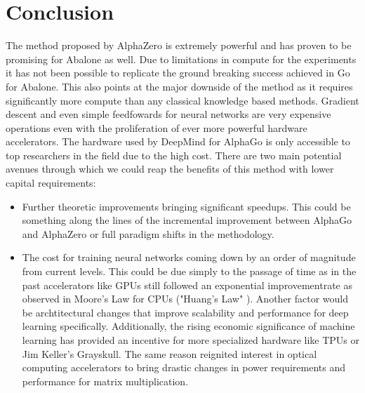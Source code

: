 \chapter{Conclusion}
\label{conclusion}
The method proposed by AlphaZero is extremely powerful and has proven to be promising for Abalone as well. Due to limitations in compute for the experiments it has not been possible to replicate the ground breaking success achieved in Go for Abalone. This also points at the major downside of the method as it requires significantly more compute than any classical knowledge based methods. Gradient descent and even simple feedfowards for neural networks are very expensive operations even with the proliferation of ever more powerful hardware accelerators. The hardware used by DeepMind for AlphaGo is only accessible to top researchers in the field due to the high cost. There are two main potential avenues through which we could reap the benefits of this method with lower capital requirements:

\begin{itemize}
    \item Further theoretic improvements bringing significant speedups. This could be something along the lines of the incremental improvement between AlphaGo and AlphaZero or full paradigm shifts in the methodology.
    \item The cost for training neural networks coming down by an order of magnitude from current levels. This could be due simply to the passage of time as in the past accelerators like GPUs still followed an exponential improvementrate as observed in Moore's Law for CPUs \cite{moore_cramming_2006} ("Huang's Law" \cite{noauthor_huangs_2021}). Another factor would be archtitectural changes that improve scalability and performance for deep learning specifically. Additionally, the rising economic significance of machine learning has provided an incentive for more specialized hardware like TPUs \cite{noauthor_tpu_nodate} or Jim Keller's Grayskull. \cite{noauthor_grayskull_nodate} The same reason reignited interest in optical computing accelerators to bring drastic changes in power requirements and performance for matrix multiplication. \cite{noauthor_lightmatter_nodate,noauthor_lightelligence_nodate}
\end{itemize}